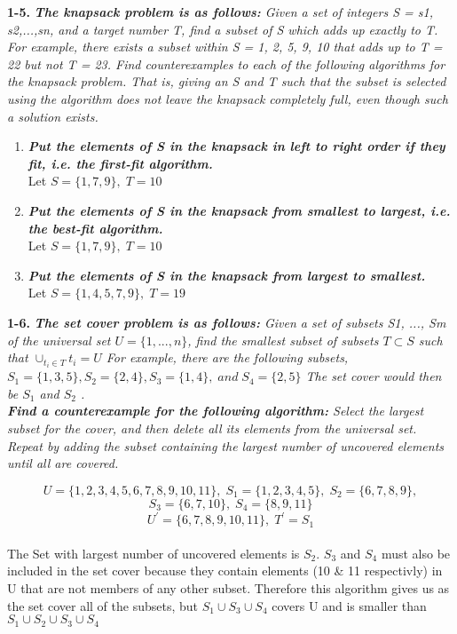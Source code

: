\textbf{1-5.} \emph{\textbf{The knapsack problem is as follows:} Given a set of integers S = {s1, s2,...,sn},
and a target number T, find a subset of S which adds up exactly to T. For example,
there exists a subset within S = {1, 2, 5, 9, 10} that adds up to T = 22 but not
T = 23.
Find counterexamples to each of the following algorithms for the knapsack problem.
That is, giving an S and T such that the subset is selected using the algorithm does
not leave the knapsack completely full, even though such a solution exists.}
	
\begin{enumerate}[label=(\alph*)]
\itemsep1pt\parskip0pt
	\item{\emph{\textbf{Put the elements of S in the knapsack in left to right order if they fit, i.e. the first-fit algorithm.}} \\
		Let $S = \{1,7,9\}, \; T = 10$
	}
	\item{\emph{\textbf{Put the elements of S in the knapsack from smallest to largest, i.e. the best-fit algorithm.}} \\
		Let $S = \{1,7,9\}, \; T = 10$
	}
	\item{\emph{\textbf{Put the elements of S in the knapsack from largest to smallest.}} \\
		Let $S = \{1,4,5,7,9\}, \; T = 19$
	}
\end{enumerate}


\textbf{1-6.} \emph{\textbf{The set cover problem is as follows: } Given a set of subsets S1, ..., Sm of the universal set 
	$U = \{1, ..., n\}$, 
	find the smallest subset of subsets 
	$T \subset S$ 
	such that  
	$\cup_{t_{i} \in T}t_{i} = U$ For example, there are the following subsets, $S_{1} = \{1, 3, 5\}, S_{2} = \{2, 4\}, S_{3} = \{1, 4\}, \; and \; S_{4} = \{2, 5\}$ The set cover would then be $S_{1}$ and $S_{2}$ . } \\

\emph{\textbf{Find a counterexample for the following algorithm:} Select the largest subset for the cover, and then delete all its elements from the universal set. Repeat by adding the subset containing the largest number of uncovered elements until all are covered.}

\begin{center}
	$$U = \{1,2,3,4,5,6,7,8,9,10,11\}, \; S_{1} = \{1,2,3,4,5\}, \; S_{2} = \{6,7,8,9\}, $$
    $$S_{3} = \{6,7,10\}, \; S_{4} = \{8,9,11\}$$ 
	$$U^{'} = \{6,7,8,9,10,11\}, \; T^{'} = S_{1}$$ \\
	The Set with largest number of uncovered elements is $S_{2}$. $S_{3}$ and $S_{4}$ must also be included in the set cover because they contain elements (10 \& 11 respectivly)
	in U that are not members of any other subset. Therefore this algorithm gives us as the set cover all of the subsets, but $S_{1} \cup S_{3} \cup S_{4}$ covers U and is smaller
	than $S_{1} \cup S_{2} \cup S_{3} \cup S_{4}$
\end{center}

